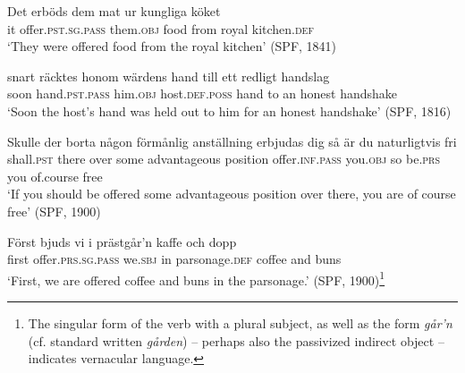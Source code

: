 \documentclass[output=paper]{langscibook}
\begin{document}
\ex\label{ex:falk:20c}
\gll Det  erböds          dem        mat    ur    kungliga    köket\\
      it      offer.\textsc{pst.sg.pass}    them.\textsc{obj}  food  from  royal      kitchen.\textsc{def}\\
\glt ‘They were offered food from the royal kitchen’ (SPF, 1841)

\ex\label{ex:falk:20d}
\gll snart  räcktes        honom    wärdens        hand  till   ett  redligt  handslag\\
      soon  hand\textsc{.pst.pass}  him\textsc{.obj}  host.\textsc{def.poss}   hand  to   an  honest   handshake\\
\glt ‘Soon the host’s hand was held out to him for an honest handshake’ (SPF, 1816)

\ex\label{ex:falk:20e}
\gll Skulle      der  borta  någon  förmånlig    anställning  erbjudas dig         så   är      du    naturligtvis    fri\\
shall.\textsc{pst}     there  over  some    advantageous  position     offer\textsc{.inf}.\textsc{pass}      you\textsc{.obj}   so  be.\textsc{prs}  you  of.course      free\\
\glt ‘If you should be offered some advantageous position over there, you are of         course free’ (SPF, 1900)

\ex\label{ex:falk:20f}
\gll Först  bjuds            vi      i  prästgår’n      kaffe    och  dopp\\
      first  offer\textsc{.prs}.\textsc{sg.pass}    we.\textsc{sbj}  in  parsonage\textsc{.def}  coffee  and  buns\\
\glt ‘First, we are offered coffee and buns in the parsonage.’ (SPF, 1900)\footnote{The singular form of the verb with a plural subject, as well as the form \textit{går’n} (cf. standard written \textit{gården}) – perhaps also the passivized indirect object – indicates vernacular language.}
\z
\z
\end{document}
